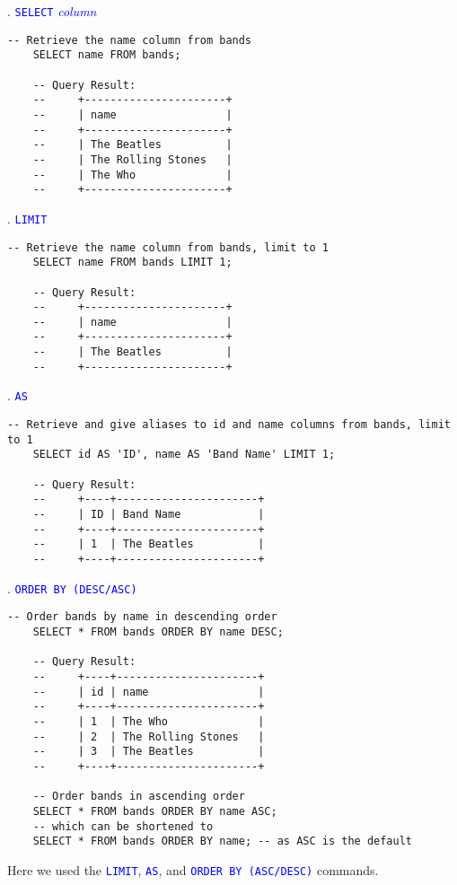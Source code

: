 . \textcolor{blue}{\texttt{SELECT} \textit{column}}
\begin{lstlisting}[style=sql]
    -- Retrieve the name column from bands
    SELECT name FROM bands;

    -- Query Result:
    --     +----------------------+
    --     | name                 |
    --     +----------------------+
    --     | The Beatles          |
    --     | The Rolling Stones   |
    --     | The Who              |
    --     +----------------------+
\end{lstlisting}
. \textcolor{blue}{\texttt{LIMIT}}
\begin{lstlisting}[style=sql]
    -- Retrieve the name column from bands, limit to 1    
    SELECT name FROM bands LIMIT 1;

    -- Query Result:
    --     +----------------------+
    --     | name                 |
    --     +----------------------+
    --     | The Beatles          |
    --     +----------------------+
\end{lstlisting}
. \textcolor{blue}{\texttt{AS}}
\begin{lstlisting}[style=sql]
    -- Retrieve and give aliases to id and name columns from bands, limit to 1
    SELECT id AS 'ID', name AS 'Band Name' LIMIT 1;

    -- Query Result:
    --     +----+----------------------+
    --     | ID | Band Name            |
    --     +----+----------------------+
    --     | 1  | The Beatles          |
    --     +----+----------------------+
\end{lstlisting}
. \textcolor{blue}{\texttt{ORDER BY (DESC/ASC)}}
\begin{lstlisting}[style=sql]
    -- Order bands by name in descending order
    SELECT * FROM bands ORDER BY name DESC;

    -- Query Result:
    --     +----+----------------------+
    --     | id | name                 |
    --     +----+----------------------+
    --     | 1  | The Who              |
    --     | 2  | The Rolling Stones   |
    --     | 3  | The Beatles          |
    --     +----+----------------------+

    -- Order bands in ascending order
    SELECT * FROM bands ORDER BY name ASC;
    -- which can be shortened to 
    SELECT * FROM bands ORDER BY name; -- as ASC is the default
\end{lstlisting}

\noindent
Here we used the \textcolor{blue}{\texttt{LIMIT}}, \textcolor{blue}{\texttt{AS}}, and \textcolor{blue}{\texttt{ORDER BY (ASC/DESC)}} commands.

